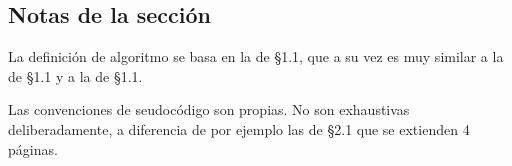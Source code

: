 \subsection*{Notas de la sección}

La definición de algoritmo se basa en la de \cite{cormen} \S 1.1, que a su vez es muy similar a la de \cite{cardoso} \S 1.1 y a la de \cite{levitin} \S 1.1.

Las convenciones de seudocódigo son propias. No son exhaustivas deliberadamente, a diferencia de por ejemplo las de \cite{cormen2022} \S 2.1 que se extienden 4 páginas.